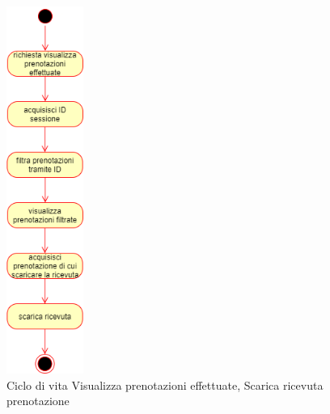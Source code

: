 \documentclass[11pt]{article}
\begin{document}
\begin{figure}[H]
\centering
\includegraphics[width=0.225\textwidth]{Ciclo di vita Visualizza prenotazioni, Scarica ricevuta prenotazione.png}
\caption{Ciclo di vita Visualizza prenotazioni effettuate, Scarica ricevuta prenotazione}
\end{figure}
\end{document}
